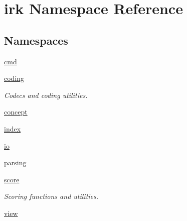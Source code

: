 \hypertarget{namespaceirk}{}\section{irk Namespace Reference}
\label{namespaceirk}
\subsection*{Namespaces}
\begin{DoxyCompactItemize}
\item 
 \mbox{\hyperlink{namespaceirk_1_1cmd}{cmd}}
\item 
 \mbox{\hyperlink{namespaceirk_1_1coding}{coding}}
\begin{DoxyCompactList}\small\item\em Codecs and coding utilities. \end{DoxyCompactList}\item 
 \mbox{\hyperlink{namespaceirk_1_1concept}{concept}}
\item 
 \mbox{\hyperlink{namespaceirk_1_1index}{index}}
\item 
 \mbox{\hyperlink{namespaceirk_1_1io}{io}}
\item 
 \mbox{\hyperlink{namespaceirk_1_1parsing}{parsing}}
\item 
 \mbox{\hyperlink{namespaceirk_1_1score}{score}}
\begin{DoxyCompactList}\small\item\em Scoring functions and utilities. \end{DoxyCompactList}\item 
 \mbox{\hyperlink{namespaceirk_1_1view}{view}}
\end{DoxyCompactItemize}
